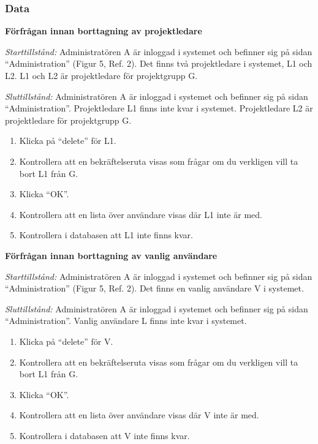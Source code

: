 \documentclass[a4paper]{article}
\begin{document}
\subsubsection{Data}
\begin{FT}
\item \textbf{Förfrågan innan borttagning av projektledare}

\emph{Starttillstånd:} Administratören A är inloggad i systemet och befinner sig på sidan ``Administration'' (Figur 5, Ref. 2). Det finns två projektledare i systemet, L1 och L2. L1 och L2 är projektledare för projektgrupp G.

\emph{Sluttillstånd:} Administratören A är inloggad i systemet och befinner sig på sidan ``Administration''. Projektledare L1 finns inte kvar i systemet. Projektledare L2 är projektledare för projektgrupp G.

\begin{enumerate}
\item Klicka på ``delete'' för L1.
\item Kontrollera att en bekräftelseruta visas som frågar om du verkligen vill ta bort L1 från G.
\item Klicka ``OK''.
\item Kontrollera att en lista över användare visas där L1 inte är med.
\item Kontrollera i databasen att L1 inte finns kvar.
\end{enumerate}

\item \textbf{Förfrågan innan borttagning av vanlig användare}

\emph{Starttillstånd:} Administratören A är inloggad i systemet och befinner sig på sidan ``Administration'' (Figur 5, Ref. 2). Det finns en vanlig användare V i systemet.

\emph{Sluttillstånd:} Administratören A är inloggad i systemet och befinner sig på sidan ``Administration''. Vanlig användare L finns inte kvar i systemet.

\begin{enumerate}
\item Klicka på ``delete'' för V.
\item Kontrollera att en bekräftelseruta visas som frågar om du verkligen vill ta bort L1 från G.
\item Klicka ``OK''.
\item Kontrollera att en lista över användare visas där V inte är med.
\item Kontrollera i databasen att V inte finns kvar.
\end{enumerate}


\end{FT}
\end{document}
